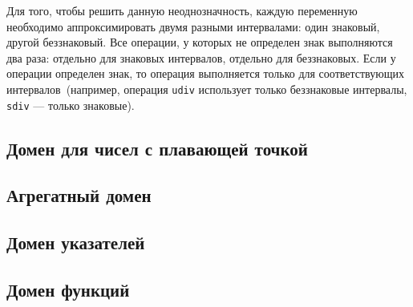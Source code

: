 Для того, чтобы решить данную неоднозначность, каждую переменную необходимо
аппроксимировать двумя разными интервалами: один знаковый, другой беззнаковый.
Все операции, у которых не определен знак выполняются два раза: отдельно для
знаковых интервалов, отдельно для беззнаковых. Если у операции определен знак,
то операция выполняется только для соответствующих интервалов~(например, 
операция \texttt{udiv} использует только беззнаковые интервалы, 
\texttt{sdiv} --- только знаковые).

\subsection{Домен для чисел с плавающей точкой}

\subsection{Агрегатный домен}

\subsection{Домен указателей}

\subsection{Домен функций}





